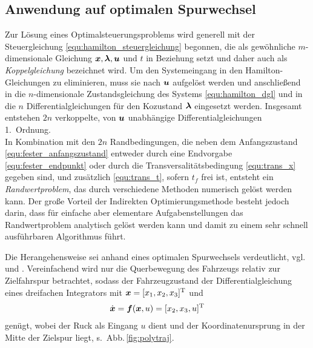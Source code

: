 \subsection{Anwendung auf optimalen Spurwechsel} \label{sec:polytraj}
Zur Lösung eines Optimalsteuerungsproblems wird generell mit der Steuergleichung \eqref{equ:hamilton_steuergleichung} begonnen, die als gewöhnliche  $m$-dimensionale Gleichung $\boldsymbol{x}, \boldsymbol{\lambda}, \boldsymbol{u}$ und $t$ in Beziehung setzt und daher auch als \emph{Koppelgleichung} bezeichnet wird. Um den Systemeingang in den Hamilton-Gleichungen zu eliminieren, muss sie nach $\boldsymbol{u}$ aufgelöst werden %
und anschließend in die $n$-dimensionale Zustandsgleichung des Systems \eqref{equ:hamilton_dgl}
 und in die $n$ Differentialgleichungen für den Kozustand $\boldsymbol{\lambda}$ eingesetzt werden. Insgesamt entstehen $2n$ verkoppelte, von $\boldsymbol{u}$ unabhängige Differentialgleichungen 1.\ Ordnung. \\
In Kombination mit den $2n$ Randbedingungen, die neben dem Anfangszustand \eqref{equ:fester_anfangszustand} entweder durch eine Endvorgabe \eqref{equ:fester_endpunkt} oder durch die Transversalitätsbedingung \eqref{equ:trans_x} gegeben sind, und zusätzlich \eqref{equ:trans_t}, sofern  $t_f$ frei ist, entsteht ein \emph{Randwertproblem}, das durch verschiedene Methoden \cite{papageorgiou2012optimierung, Graichen2012} numerisch gelöst werden kann. Der große Vorteil der Indirekten Optimierungsmethode besteht jedoch darin, dass für einfache aber elementare Aufgabenstellungen das Randwertproblem analytisch gelöst werden kann und damit zu einem sehr schnell ausführbaren Algorithmus führt.

Die Herangehensweise sei anhand eines optimalen Spurwechsels verdeutlicht, vgl.\  und \cite{Hult2013Thesis}. Vereinfachend wird nur die Querbewegung des Fahrzeugs relativ zur Zielfahrspur betrachtet, sodass der Fahrzeugzustand der Differentialgleichung eines dreifachen Integrators mit $\boldsymbol{x} = [x_1, x_2, x_3]^{{\rm T}}$ und
\begin{align*}
	\dot{\boldsymbol{x}} = \boldsymbol{f}(\boldsymbol{x}, u) = [x_2, x_3, u ]^{{\rm T}}
\end{align*}
genügt, wobei der Ruck als Eingang $u$ dient und der Koordinatenursprung in der Mitte der Zielspur liegt, s.\ Abb.\,\ref{fig:polytraj}. \\

